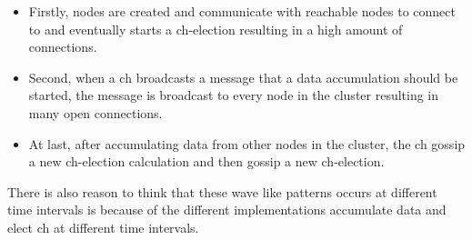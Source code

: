 \documentclass[USenglish]{uit-thesis}
\begin{document}
\begin{itemize}
\item Firstly, nodes are created and communicate with reachable nodes to connect to and eventually starts a \gls{ch}-election resulting in a high amount of connections.
\item Second, when a \gls{ch} broadcasts a message that a data accumulation should be started, the message is broadcast to every node in the cluster resulting in many open connections.
\item At last, after accumulating data from other nodes in the cluster, the \gls{ch} gossip a new \gls{ch}-election calculation and then gossip a new \gls{ch}-election.
\end{itemize}

There is also reason to think that these wave like patterns occurs at different time intervals is because of the different implementations accumulate data and elect \gls{ch} at different time intervals.


\end{document}
